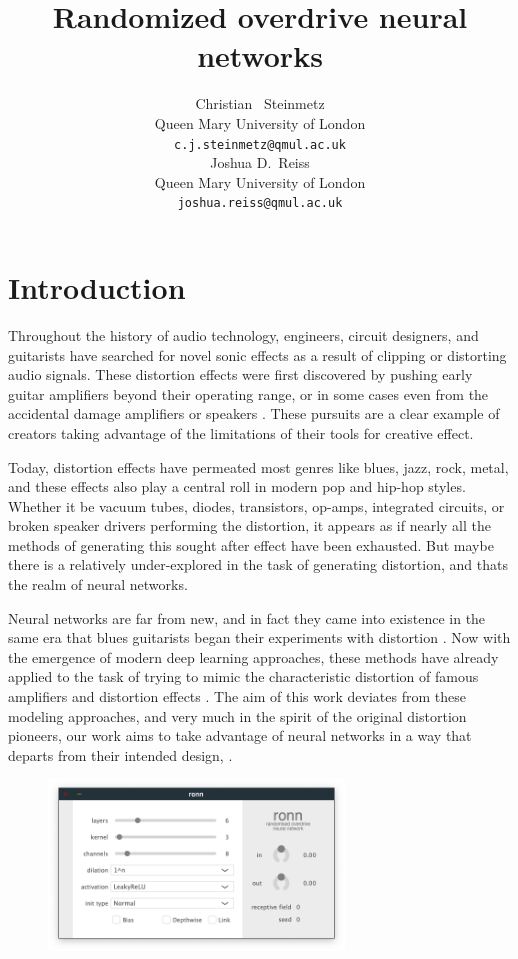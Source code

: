 \documentclass{article}
\title{Randomized overdrive neural networks}
\author{%
  Christian ~Steinmetz \\
  Queen Mary University of London\\
  \texttt{c.j.steinmetz@qmul.ac.uk} \\
  \And
  Joshua D.~Reiss \\
  Queen Mary University of London \\
  \texttt{joshua.reiss@qmul.ac.uk} \\
}
\begin{document}
\maketitle

\begin{abstract}

\end{abstract} 
 
\section{Introduction}

Throughout the history of audio technology, engineers, circuit designers, 
and guitarists have searched for novel sonic effects as a result of clipping or distorting audio signals. 
These distortion effects were first discovered by pushing early guitar amplifiers beyond their operating range, 
or in some cases even from the accidental damage amplifiers or speakers \cite{shepherd2003distortion}. 
These pursuits are a clear example of creators taking advantage of the limitations of their tools for creative effect.

Today, distortion effects have permeated most genres like blues, jazz, rock, metal, 
and these effects also play a central roll in modern pop and hip-hop styles.
Whether it be vacuum tubes, diodes, transistors, op-amps, integrated circuits, or broken speaker drivers performing the distortion, 
it appears as if nearly all the methods of generating this sought after effect have been exhausted. 
But maybe there is a relatively under-explored in the task of generating distortion, and thats the realm of neural networks.

Neural networks are far from new,
and in fact they came into existence in the same era that blues guitarists began their experiments with distortion \cite{schmidhuber2015deep}.
Now with the emergence of modern deep learning approaches, 
these methods have already applied to the task of trying to mimic the characteristic distortion of famous amplifiers and distortion effects 
\cite{covert2013rnn, schmitz2018nonlinear, zhang2018lstm, damskagg2019distortion, martinez2019nonlinear}.
The aim of this work deviates from these modeling approaches, and very much in the spirit of the original distortion pioneers, 
our work aims to take advantage of neural networks 
in a way that departs from their intended design, . 

\cite{deman2014adaptive}
 
\begin{figure}[h]
  \centering
  \includegraphics[width=0.7\textwidth]{ronn-vst-ui.png}
\end{figure}
\end{document}
